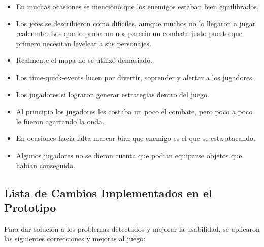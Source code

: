  \begin{itemize}
    \item  En muchas ocasiones se mencionó que los enemigos estaban bien equilibrados.
    \item Los jefes se describieron como dificiles, aunque muchos no lo llegaron a jugar realemnte. Los que lo probaron nos parecio un combate justo puesto que primero necesitan levelear a sus personajes.
    \item Realmente el mapa no se utilizó demasiado.
    \item Los time-quick-events lucen por divertir, soprender y alertar a los jugadores.
    \item Los jugadores si lograron generar estrategias dentro del juego.
    \item Al principio los jugadores les costaba un poco el combate, pero poco a poco le fueron agarrando la onda.
    \item En ocasiones hacia falta marcar birn que enemigo es el que se esta atacando.
    \item Algunos jugadores no se dieron cuenta que podian equiparse objetos que habian conseguido.
\end{itemize}

\subsection{Lista de Cambios Implementados en el Prototipo}

Para dar solución a los problemas detectados y mejorar la usabilidad, se aplicaron las siguientes correcciones y mejoras al juego:

